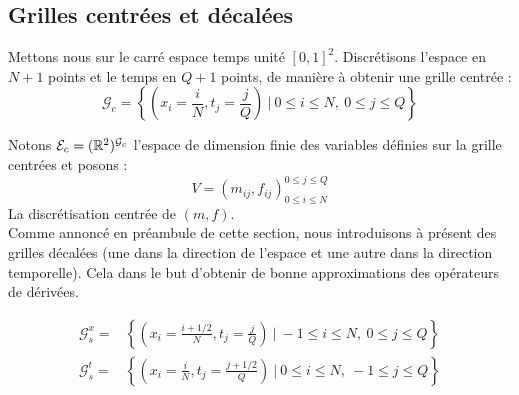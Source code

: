 \documentclass[a4paper,12pt]{article}
\begin{document}
\subsection{Grilles centrées et décalées}
Mettons nous sur le carré espace temps unité $[0,1]^2$. Discrétisons l'espace en $N+1$ points et le temps en $Q+1$ points, de manière à obtenir une grille centrée :
$$
\mathcal{G}_c = \left\{(x_i=\frac{i}{N},t_j=\frac{j}{Q})\ |\ 0\leq i\leq N,\ 0\leq j\leq Q\right\}
$$


Notons $\mathcal{E}_c=(\mathbb{R}^2)^{\mathcal{G}_c}$ l'espace de dimension finie des variables définies sur la grille centrées et posons : 
$$
V = (m_{ij},f_{ij})_{0\leq i\leq N}^{0\leq j\leq Q}
$$
La discrétisation centrée de $(m,f)$. \\

Comme annoncé en préambule de cette section, nous introduisons à présent des grilles décalées (une dans la direction de l'espace et une autre dans la direction temporelle). Cela dans le but d'obtenir de bonne approximations des opérateurs de dérivées. 

\begin{align}
\mathcal{G}_s^x = &\left\{(x_i=\frac{i+1/2}{N},t_j=\frac{j}{Q})\ |\ -1\leq i\leq N,\ 0\leq j\leq Q\right\} \\
\mathcal{G}_s^t = &\left\{(x_i=\frac{i}{N},t_j=\frac{j+1/2}{Q})\ |\ 0\leq i\leq N,\ -1\leq j\leq Q\right\}
\end{align}
\end{document}
